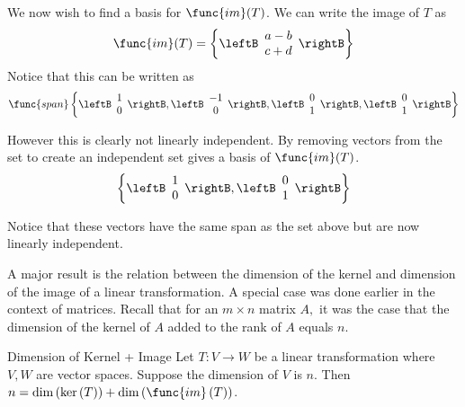 \begin{solution}
We now wish to find a basis for $\func{im}(T)$. We can write the image of $T$ as 
\[
\func{im}(T) = \left\{ 
\leftB \begin{array}{c}
a - b  \\
c + d  
\end{array}
\rightB
\right\}
\]
Notice that this can be written as 
\[
\func{span}
\left\{
\leftB \begin{array}{c}
1 \\ 
0
\end{array}\rightB, 
\leftB \begin{array}{c}
-1 \\ 
0
\end{array}\rightB, 
\leftB \begin{array}{c}
0 \\ 
1
\end{array}\rightB, 
\leftB \begin{array}{c}
0 \\ 
1
\end{array}\rightB \right\}
\]

However this is clearly not linearly independent. By removing vectors from the set to create an independent set gives a basis of $\func{im}(T)$.
\[
\left\{
\leftB \begin{array}{c}
1 \\ 
0
\end{array}\rightB, 
\leftB \begin{array}{c}
0 \\ 
1
\end{array}\rightB
\right\}
\]

Notice that these vectors have the same span as the set above but are now linearly independent.
\end{solution}

A major result is the relation between the dimension of the kernel and
dimension of the image of a linear transformation. A special case was done
earlier in the context of matrices. Recall that for an $m\times n$ matrix $%
A, $ it was the case that the dimension of the kernel of $A$ added to the
rank of $A$ equals $n$. 

\begin{theorem}{Dimension of Kernel + Image}
Let $T:V\rightarrow W$ be a linear transformation where $V,W$ are vector
spaces. Suppose the dimension of $V$ is $n$.
Then $n=\dim \left( \ker \left( T\right) \right) +\dim \left( \func{im}
\left( T\right) \right) $.
\end{theorem}

